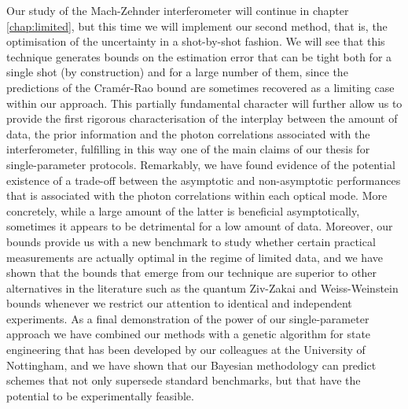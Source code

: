 Our study of the Mach-Zehnder interferometer will continue in chapter \ref{chap:limited}, but this time we will implement our second method, that is, the optimisation of the uncertainty in a shot-by-shot fashion. We will see that this technique generates bounds on the estimation error that can be tight both for a single shot (by construction) and for a large number of them, since the predictions of the Cram\'{e}r-Rao bound are sometimes recovered as a limiting case within our approach. This partially fundamental character will further allow us to provide the first rigorous characterisation of the interplay between the amount of data, the prior information and the photon correlations associated with the interferometer, fulfilling in this way one of the main claims of our thesis for single-parameter protocols. Remarkably, we have found evidence of the potential existence of a trade-off between the asymptotic and non-asymptotic performances that is associated with the photon correlations within each optical mode. More concretely, while a large amount of the latter is beneficial asymptotically, sometimes it appears to be detrimental for a low amount of data. Moreover, our bounds provide us with a new benchmark to study whether certain practical measurements are actually optimal in the regime of limited data, and we have shown that the bounds that emerge from our technique are superior to other alternatives in the literature such as the quantum Ziv-Zakai and Weiss-Weinstein bounds \cite{tsang2012, tsang2016} whenever we restrict our attention to identical and independent experiments. As a final demonstration of the power of our single-parameter approach we have combined our methods with a genetic algorithm for state engineering that has been developed by our colleagues at the University of Nottingham, and we have shown that our Bayesian methodology can predict schemes that not only supersede standard benchmarks, but that have the potential to be experimentally feasible. 

